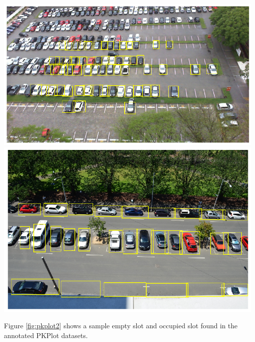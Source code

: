 \documentclass[man]{apa7}
\begin{document}
\begin{minipage}{\linewidth}
  \includegraphics[height=\textheight/4,width=\textwidth/2]{figures/pkplot.png}
  \includegraphics[height=\textheight/4,width=\textwidth/2]{figures/barrystreet.png}
  \label{fig:datasetImages}
\end{minipage}

Figure \ref{fig:pkplot2} shows a sample empty slot and occupied slot found in the annotated PKPlot datasets.
\end{document}
